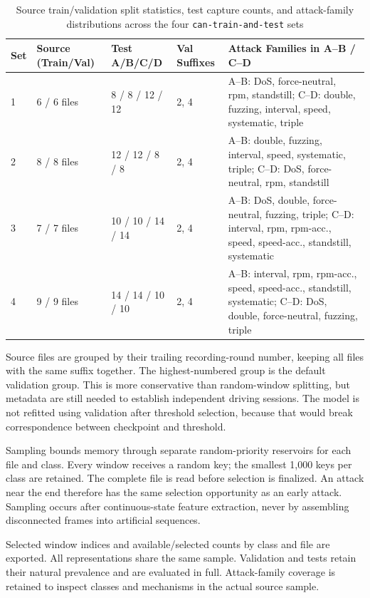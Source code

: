 \documentclass[12pt, a4paper, reqno, oneside]{book}
\begin{document}
{\renewcommand{\arraystretch}{0.88}
\begin{table}[htbp]\centering\footnotesize
\caption{Source train/validation split statistics, test capture counts, and attack-family distributions across the four \texttt{can-train-and-test} sets}\label{tab:split-stats}
\begin{tabular}{P{1.1cm}P{2.2cm}P{2.2cm}P{1.5cm}P{6.3cm}}
\toprule
Set & Source (Train/Val) & Test A/B/C/D & Val Suffixes & Attack Families in A--B / C--D \\  & 6 / 6 files & 8 / 8 / 12 / 12 & 2, 4 & A--B: DoS, force-neutral, rpm, standstill; C--D: double, fuzzing, interval, speed, systematic, triple \\
2 & 8 / 8 files & 12 / 12 / 8 / 8 & 2, 4 & A--B: double, fuzzing, interval, speed, systematic, triple; C--D: DoS, force-neutral, rpm, standstill \\
3 & 7 / 7 files & 10 / 10 / 14 / 14 & 2, 4 & A--B: DoS, double, force-neutral, fuzzing, triple; C--D: interval, rpm, rpm-acc., speed, speed-acc., standstill, systematic \\
4 & 9 / 9 files & 14 / 14 / 10 / 10 & 2, 4 & A--B: interval, rpm, rpm-acc., speed, speed-acc., standstill, systematic; C--D: DoS, double, force-neutral, fuzzing, triple \\
\bottomrule
\end{tabular}
\end{table}}

Source files are grouped by their trailing recording-round number, keeping all files with the same suffix together. The highest-numbered group is the default validation group. This is more conservative than random-window splitting, but metadata are still needed to establish independent driving sessions. The model is not refitted using validation after threshold selection, because that would break correspondence between checkpoint and threshold.

Sampling bounds memory through separate random-priority reservoirs for each file and class. Every window receives a random key; the smallest 1,000 keys per class are retained. The complete file is read before selection is finalized. An attack near the end therefore has the same selection opportunity as an early attack. Sampling occurs after continuous-state feature extraction, never by assembling disconnected frames into artificial sequences.

Selected window indices and available/selected counts by class and file are exported. All representations share the same sample. Validation and tests retain their natural prevalence and are evaluated in full. Attack-family coverage is retained to inspect classes and mechanisms in the actual source sample.
\end{document}
